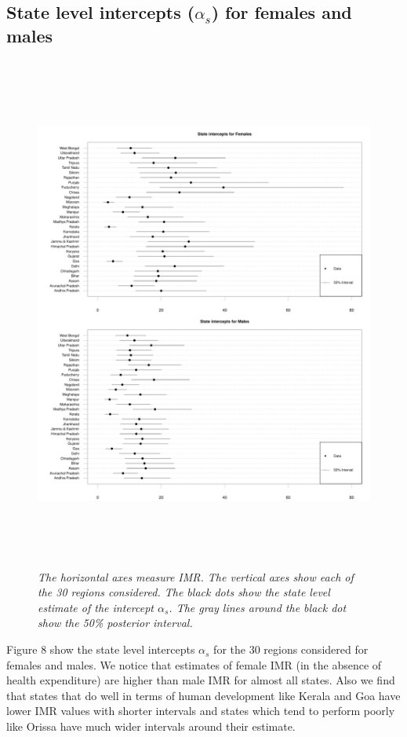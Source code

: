 \documentclass{article}
\begin{document}
\subsection{State level intercepts ($\alpha_s$) for females and males}
\begin{figure}[H]
   \begin{center}
   \includegraphics[height = 17cm, width = 15cm]{state_int.pdf}
   \end{center}
   \caption{\emph{The horizontal axes measure IMR. The vertical axes show each of the 30 regions considered. The black dots show the state level estimate of the intercept $\alpha_s$. The gray lines around the black dot show the 50\% posterior interval.}}
\end{figure}
Figure 8 show the state level intercepts $\alpha_s$ for the 30 regions considered for females and males. We notice that estimates of female IMR (in the absence of health expenditure) are higher than male IMR for almost all states. Also we find that states that do well in terms of human development like Kerala and Goa have lower IMR values with shorter intervals and states which tend to perform poorly like Orissa have much wider intervals around their estimate.
\end{document}
